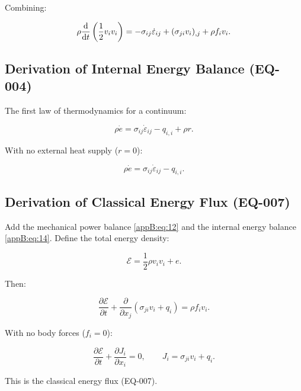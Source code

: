 Combining:

\begin{equation}
\rho \frac{\mathrm{d}}{\mathrm{d} t}\left(\frac{1}{2}v_i v_i\right)
=
-\sigma_{ij}\dot{\varepsilon}_{ij} + (\sigma_{ji}v_i)_{,j} + \rho f_i v_i.
\label{appB:eq:12}
\end{equation}

\subsection{Derivation of Internal Energy Balance (EQ-004)}

The first law of thermodynamics for a continuum:

\begin{equation}
\rho \dot{e} = \sigma_{ij}\dot{\varepsilon}_{ij} - q_{i,i} + \rho r.
\label{appB:eq:13}
\end{equation}

With no external heat supply ($r=0$):

\begin{equation}
\rho \dot{e} = \sigma_{ij}\dot{\varepsilon}_{ij} - q_{i,i}.
\label{appB:eq:14}
\end{equation}

\subsection{Derivation of Classical Energy Flux (EQ-007)}

Add the mechanical power balance \eqref{appB:eq:12} and the internal energy balance \eqref{appB:eq:14}. Define the total energy density:

\begin{equation}
\mathcal{E} = \frac{1}{2}\rho v_i v_i + e.
\label{appB:eq:15}
\end{equation}

Then:

\begin{equation}
\frac{\partial\mathcal{E}}{\partial t}
+
\frac{\partial}{\partial x_j}\left(\sigma_{ji}v_i + q_i\right)
=
\rho f_i v_i.
\label{appB:eq:16}
\end{equation}

With no body forces ($f_i=0$):

\begin{equation}
\frac{\partial\mathcal{E}}{\partial t} + \frac{\partial J_i}{\partial x_i} = 0,
\qquad
J_i = \sigma_{ji}v_i + q_i.
\label{appB:eq:17}
\end{equation}

This is the classical energy flux (EQ-007).

